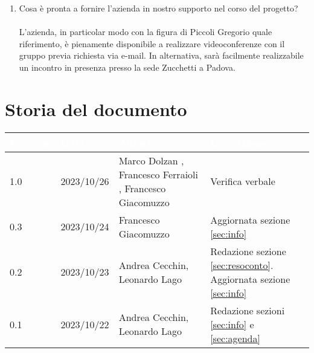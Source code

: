 \documentclass[12pt]{article}
\begin{document}
\begin{enumerate}
    \item Cosa è pronta a fornire l'azienda in nostro supporto nel corso del progetto?\\ \\
L'azienda, in particolar modo con la figura di Piccoli Gregorio quale riferimento, è pienamente disponibile a realizzare videoconferenze con il gruppo previa richiesta via e-mail. In alternativa, sarà facilmente realizzabile un incontro in presenza presso la sede Zucchetti a Padova.
    
\end{enumerate}

\section{Storia del documento} \label{sec:storia}
\begingroup
\setlength{\tabcolsep}{10pt}
\renewcommand{\arraystretch}{1.5}
\begin{tabularx}{\textwidth}{| l | l | X | X |}
    \hline
    \rowcolor{headerrow} \textbf{\textcolor{white}{Versione}} & \textbf{\textcolor{white}{Data}} & \textbf{\textcolor{white}{Autori}} & \textbf{\textcolor{white}{Descrizione}} \\
    \hline
    1.0 & 2023/10/26 & Marco Dolzan , Francesco Ferraioli , Francesco Giacomuzzo & Verifica verbale \\
    \hline
    0.3 & 2023/10/24 & Francesco Giacomuzzo & Aggiornata sezione \ref{sec:info}\\
    \hline
    0.2 & 2023/10/23 & Andrea Cecchin, Leonardo Lago & Redazione sezione \ref{sec:resoconto}. Aggiornata sezione \ref{sec:info}\\
    \hline
    0.1 & 2023/10/22 & Andrea Cecchin, Leonardo Lago  & Redazione sezioni \ref{sec:info} e \ref{sec:agenda}\\
    \hline
\end{tabularx}  
\endgroup
\end{document}
